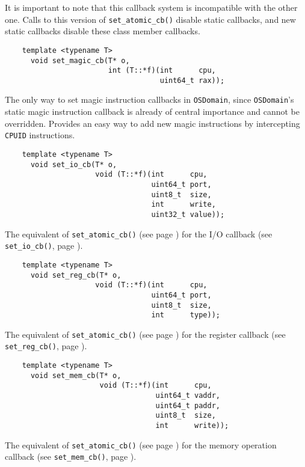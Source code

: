 \documentclass[letterpaper, 10pt]{book}
\begin{document}
It is important to note that this callback system is incompatible with the
other one. Calls to this version of \texttt{set\_atomic\_cb()} disable static
callbacks, and new static callbacks disable these class member callbacks.

\label{tf:set_magic_cb} \begin{verbatim}
    template <typename T>
      void set_magic_cb(T* o,
                        int (T::*f)(int      cpu, 
                                    uint64_t rax));
\end{verbatim}
The only way to set magic instruction callbacks in \texttt{OSDomain}, since
\texttt{OSDomain}'s static magic instruction callback is already of central
importance and cannot be overridden. Provides an easy way to add new magic
instructions by intercepting \texttt{CPUID} instructions.

\label{tf:set_io_cb} \begin{verbatim}
    template <typename T>
      void set_io_cb(T* o,
                     void (T::*f)(int      cpu, 
                                  uint64_t port,
                                  uint8_t  size, 
                                  int      write,
                                  uint32_t value));
\end{verbatim}
The equivalent of \texttt{set\_atomic\_cb()} (see page
\pageref{tf:set_atomic_cb}) for the I/O callback (see \texttt{set\_io\_cb()}, 
page \pageref{func:set_io_cb}).

\label{tf:set_reg_cb} \begin{verbatim} 
    template <typename T>
      void set_reg_cb(T* o,
                     void (T::*f)(int      cpu,
                                  uint64_t port,
                                  uint8_t  size,
                                  int      type));
\end{verbatim}
The equivalent of \texttt{set\_atomic\_cb()} (see page
\pageref{tf:set_atomic_cb}) for the register callback (see 
\texttt{set\_reg\_cb()}, page \pageref{func:set_reg_cb}).


\label{tf:set_mem_cb} \begin{verbatim}
    template <typename T>
      void set_mem_cb(T* o,
                      void (T::*f)(int      cpu,
                                   uint64_t vaddr, 
                                   uint64_t paddr,
                                   uint8_t  size,
                                   int      write));
\end{verbatim}
The equivalent of \texttt{set\_atomic\_cb()} (see page 
\pageref{tf:set_atomic_cb}) for the memory operation callback (see 
\texttt{set\_mem\_cb()}, page \pageref{func:set_mem_cb}).
\end{document}
